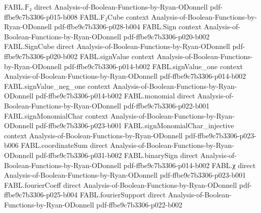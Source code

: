 \begin{theorem}
\label{FABL.RandomizedDecisionTree.symmetrization_revealment_eq_averageCost_div}
\leanok
{}
\proofstep
  {FABL.𝔽₂}
  {direct}
  {Analysis-of-Boolean-Functions-by-Ryan-ODonnell}
  {pdf-ffbe9c7b3306-p015-b008}
\proofstep
  {FABL.F₂Cube}
  {context}
  {Analysis-of-Boolean-Functions-by-Ryan-ODonnell}
  {pdf-ffbe9c7b3306-p028-b004}
\proofstep
  {FABL.Sign}
  {context}
  {Analysis-of-Boolean-Functions-by-Ryan-ODonnell}
  {pdf-ffbe9c7b3306-p020-b002}
\proofstep
  {FABL.SignCube}
  {direct}
  {Analysis-of-Boolean-Functions-by-Ryan-ODonnell}
  {pdf-ffbe9c7b3306-p020-b002}
\proofstep
  {FABL.signValue}
  {context}
  {Analysis-of-Boolean-Functions-by-Ryan-ODonnell}
  {pdf-ffbe9c7b3306-p014-b002}
\proofstep
  {FABL.signValue_one}
  {context}
  {Analysis-of-Boolean-Functions-by-Ryan-ODonnell}
  {pdf-ffbe9c7b3306-p014-b002}
\proofstep
  {FABL.signValue_neg_one}
  {context}
  {Analysis-of-Boolean-Functions-by-Ryan-ODonnell}
  {pdf-ffbe9c7b3306-p014-b002}
\proofstep
  {FABL.monomial}
  {direct}
  {Analysis-of-Boolean-Functions-by-Ryan-ODonnell}
  {pdf-ffbe9c7b3306-p022-b001}
\proofstep
  {FABL.signMonomialChar}
  {context}
  {Analysis-of-Boolean-Functions-by-Ryan-ODonnell}
  {pdf-ffbe9c7b3306-p023-b001}
\proofstep
  {FABL.signMonomialChar_injective}
  {context}
  {Analysis-of-Boolean-Functions-by-Ryan-ODonnell}
  {pdf-ffbe9c7b3306-p023-b006}
\proofstep
  {FABL.coordinateSum}
  {direct}
  {Analysis-of-Boolean-Functions-by-Ryan-ODonnell}
  {pdf-ffbe9c7b3306-p031-b002}
\proofstep
  {FABL.binarySign}
  {direct}
  {Analysis-of-Boolean-Functions-by-Ryan-ODonnell}
  {pdf-ffbe9c7b3306-p014-b002}
\proofstep
  {FABL.χ}
  {direct}
  {Analysis-of-Boolean-Functions-by-Ryan-ODonnell}
  {pdf-ffbe9c7b3306-p023-b001}
\proofstep
  {FABL.fourierCoeff}
  {direct}
  {Analysis-of-Boolean-Functions-by-Ryan-ODonnell}
  {pdf-ffbe9c7b3306-p025-b004}
\proofstep
  {FABL.fourierSupport}
  {direct}
  {Analysis-of-Boolean-Functions-by-Ryan-ODonnell}
  {pdf-ffbe9c7b3306-p022-b002}

\end{theorem}
